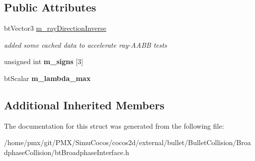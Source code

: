 \subsection*{Public Attributes}
\begin{DoxyCompactItemize}
\item 
\mbox{\label{structbtBroadphaseRayCallback_a03043069b99348e18f6c386469450145}} 
bt\+Vector3 \hyperlink{structbtBroadphaseRayCallback_a03043069b99348e18f6c386469450145}{m\+\_\+ray\+Direction\+Inverse}
\begin{DoxyCompactList}\small\item\em added some cached data to accelerate ray-\/\+A\+A\+BB tests \end{DoxyCompactList}\item 
\mbox{\label{structbtBroadphaseRayCallback_a9483f6430e2016887fd26d78ed0e6b42}} 
unsigned int {\bfseries m\+\_\+signs} \mbox{[}3\mbox{]}
\item 
\mbox{\label{structbtBroadphaseRayCallback_aae217adc2c86b77abb636f2ebaa1f548}} 
bt\+Scalar {\bfseries m\+\_\+lambda\+\_\+max}
\end{DoxyCompactItemize}
\subsection*{Additional Inherited Members}


The documentation for this struct was generated from the following file\+:\begin{DoxyCompactItemize}
\item 
/home/pmx/git/\+P\+M\+X/\+Simu\+Cocos/cocos2d/external/bullet/\+Bullet\+Collision/\+Broadphase\+Collision/bt\+Broadphase\+Interface.\+h\end{DoxyCompactItemize}
